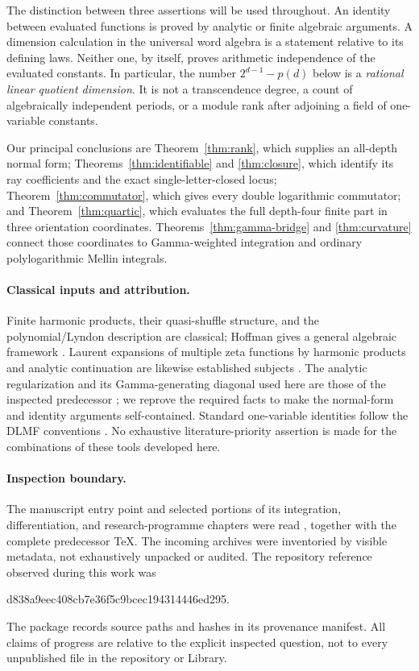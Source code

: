 \documentclass[11pt]{article}
\numberwithin{equation}{section}
\theoremstyle{definition}
\begin{document}
The distinction between three assertions will be used throughout.
An identity between evaluated functions is proved by analytic or finite
algebraic arguments. A dimension calculation in the universal word algebra
is a statement relative to its defining laws. Neither one, by itself,
proves arithmetic independence of the evaluated constants. In particular,
the number $2^{d-1}-p(d)$ below is a \emph{rational linear quotient dimension}.
It is not a transcendence degree, a count of algebraically independent
periods, or a module rank after adjoining a field of one-variable constants.

Our principal conclusions are Theorem~\ref{thm:rank}, which supplies an
all-depth normal form; Theorems~\ref{thm:identifiable} and
\ref{thm:closure}, which identify its ray coefficients and the exact
single-letter-closed locus; Theorem~\ref{thm:commutator}, which gives every
double logarithmic commutator; and Theorem~\ref{thm:quartic}, which evaluates
the full depth-four finite part in three orientation coordinates.
Theorems~\ref{thm:gamma-bridge} and \ref{thm:curvature} connect those
coordinates to Gamma-weighted integration and ordinary polylogarithmic
Mellin integrals.

\paragraph{Classical inputs and attribution.}
Finite harmonic products, their quasi-shuffle structure, and the
polynomial/Lyndon description are classical; Hoffman gives a general
algebraic framework \cite{hoffman}. Laurent expansions of multiple zeta
functions by harmonic products and analytic continuation are likewise
established subjects \cite{mow}. The analytic regularization and its
Gamma-generating diagonal used here are those of the inspected predecessor
\cite{ordered}; we reprove the required facts to make the normal-form and
identity arguments self-contained. Standard one-variable identities follow
the DLMF conventions \cite{dlmf-zeta,dlmf-polylog,dlmf-lerch,dlmf-gamma}.
No exhaustive literature-priority assertion is made for the combinations
of these tools developed here.

\paragraph{Inspection boundary.}
The manuscript entry point and selected portions of its integration,
differentiation, and research-programme chapters were read \cite{repo-manuscript,repo-discovery}, together with
the complete predecessor TeX. The incoming archives were inventoried by
visible metadata, not exhaustively unpacked or audited. The repository
reference observed during this work was
\begin{center}\small\ttfamily
d838a9eec408cb7e36f5c9bcec194314446ed295.
\end{center}
The package records source paths and hashes in its provenance manifest.
All claims of progress are relative to the explicit inspected question,
not to every unpublished file in the repository or Library.
\end{document}
